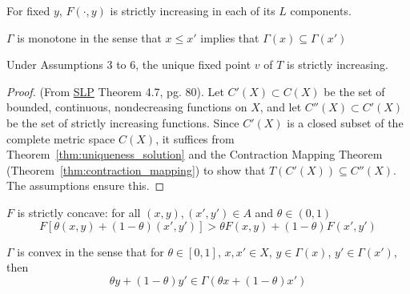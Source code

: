\documentclass[10pt]{article}
\begin{document}
\begin{assumption}
	For fixed $y$, $F(\cdot,y)$ is strictly increasing in each of its $L$ components.
\end{assumption}
\begin{assumption}
	$\Gamma$ is monotone in the sense that $x \le x'$ implies that $\Gamma(x) \subseteq \Gamma(x')$
\end{assumption}
\begin{theorem}\label{thm:monotonic_value}
	Under Assumptions 3 to 6, the unique fixed point $v$ of $T$ is strictly increasing.
\end{theorem}
\begin{proof}
	(From \href{https://www.hup.harvard.edu/books/9780674750968}{SLP} Theorem 4.7, pg. 80). Let $C'(X) \subset C(X)$ be the set of bounded, continuous, nondecreasing functions on $X$, and let $C''(X) \subset C'(X)$ be the set of strictly increasing functions. Since $C'(X)$ is a closed subset of the complete metric space $C(X)$, it suffices from Theorem~\ref{thm:uniqueness_solution} and the Contraction Mapping Theorem (Theorem~\ref{thm:contraction_mapping}) to show that $T(C'(X)) \subseteq C''(X)$. The assumptions ensure this.
\end{proof}

\begin{assumption}
	$F$ is strictly concave: for all $(x,y),(x',y') \in A$ and $\theta \in (0,1)$
	\[
	F[\theta(x,y) + (1-\theta)(x',y')] > \theta F(x,y) + (1-\theta) F(x',y')
	\]
\end{assumption}
\begin{assumption}
	$\Gamma$ is convex in the sense that for $\theta \in [0,1]$, $x,x' \in X$, $y \in \Gamma(x)$, $y' \in \Gamma(x')$, then
	\[
	\theta y + (1-\theta) y' \in \Gamma(\theta x + (1-\theta) x')
	\]
\end{assumption}
\end{document}
